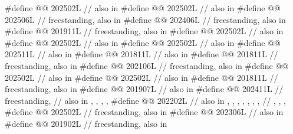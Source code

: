 \begin{codeblock}
#define @@                    202502L // also in 
#define @@                     202502L // also in 
#define @@                  202506L // freestanding, also in 
#define @@                     202406L // freestanding, also in 
#define @@                 201911L // freestanding, also in 
#define @@                   202502L // also in 
#define @@                     202502L // also in 
#define @@                   202502L // also in 
#define @@                  202511L // also in 
#define @@             201811L // also in 
#define @@                   201811L // freestanding, also in 
#define @@                202106L // freestanding, also in 
#define @@           202502L // also in 
#define @@           202502L // also in 
#define @@                 201811L // freestanding, also in 
#define @@                  201907L // also in 
#define @@              202411L // freestanding,
  // also in , , , , 
#define @@                 202202L
  // also in , , , , , , ,
  // , , , 
#define @@                         202502L // freestanding, also in 
#define @@                 202306L // also in 
#define @@                         201902L // freestanding, also in 

\end{codeblock}
